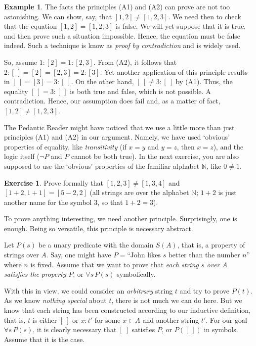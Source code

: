 \documentclass[12pt,notitlepage]{article}
\theoremstyle{plain}
\theoremstyle{definition}
\newtheorem{exc}[thm]{Exercise}
\newtheorem{exm}[thm]{Example}
\theoremstyle{plain}
\newcommand{\N}{\mathbb{N}}
\newcommand{\1}{\mathbf{1}}
\newcommand{\0}{\mathbf{0}}
\begin{document}
\begin{exm}
The facts the principles (A1) and (A2) can prove are not too astonishing. We can show, say, that $[1,2] \neq [1,2,3]$. We need then to check that the equation $[1,2] = [1,2,3]$ is false. We will yet suppose that it is true, and then prove such a situation impossible. Hence, the equation must be false indeed. Such a technique is know as \emph{proof by contradiction} and is widely used.

So, assume  $1:[2] = 1:[2,3]$. From (A2), it follows that $2 : [\ ] = [2] = [2,3] = 2 : [3]$. Yet another application of this principle results in $[\ ] = [3] = 3 : [\ ]$. On the other hand, $[\ ] \neq 3 : [\ ]$ by (A1). Thus, the equality $[\ ] = 3 : [\ ]$ is both true and false, which is not possible. A contradiction. Hence, our assumption does fail and, as a matter of fact, $[1,2] \neq [1,2,3]$.

The Pedantic Reader might have noticed that we use a little more than just principles (A1) and (A2) in our argument. Namely, we have used `obvious' properties of equality, like \emph{transitivity} (if $x = y$ and $y = z$, then $x = z$), and the logic itself ($\neg P$ and $P$ cannot be both true). In the next exercise, you are also supposed to use the `obvious' properties of the familiar alphabet $\N$, like $0 \neq 1$.
\end{exm}

\begin{exc}
Prove formally that $[1,2,3] \neq [1,3,4]$ and $[1 + 2, 1 + 1] = [5 - 2, 2]$ (all strings are over the alphabet $\N$; $1 + 2$ is just another name for the symbol $3$, so that $1 + 2 = 3$).
\end{exc}

To prove anything interesting, we need another principle. Surprisingly, one is enough. Being so versatile, this principle is necessary abstract.

Let $P(s)$ be a unary predicate with the domain $S(A)$, that is, a property of strings over $A$. Say, one might have $P = \mbox{``John likes $s$ better than the number $n$''}$ where $n$ is fixed. Assume that we want to prove that \emph{each string $s$ over $A$ satisfies the property $P$}, or $\forall s\, P(s)$ symbolically.

With this in view, we could consider an \emph{arbitrary} string $t$ and try to prove $P(t)$. As we know \emph{nothing special} about $t$, there is not much we can do here. But we know that each string has been constructed according to our inductive definition, that is, $t$ is either $[\ ]$ or $x : t'$ for some $x \in A$ and another string $t'$. For our goal $\forall s\, P(s)$, it is clearly necessary that $[\ ]$ satisfies $P$, or $P([\ ])$ in symbols. Assume that it is the case.
\end{document}
